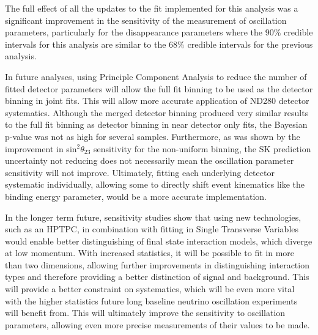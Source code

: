 The full effect of all the updates to the fit implemented for this analysis was a significant improvement in the sensitivity of the measurement of oscillation parameters, particularly for the disappearance parameters where the $90\%$ credible intervals for this analysis are similar to the $68\%$ credible intervals for the previous analysis.

In future analyses, using Principle Component Analysis to reduce the number of fitted detector parameters will allow the full fit binning to be used as the detector binning in joint fits. This will allow more accurate application of ND280 detector systematics. Although the merged detector binning produced very similar results to the full fit binning as detector binning in near detector only fits, the Bayesian p-value was not as high for several samples. Furthermore, as was shown by the improvement in sin$^2\theta_{23}$ sensitivity for the non-uniform binning, the SK prediction uncertainty not reducing does not necessarily mean the oscillation parameter sensitivity will not improve. Ultimately, fitting each underlying detector systematic individually, allowing some to directly shift event kinematics like the binding energy parameter, would be a more accurate implementation.

In the longer term future, sensitivity studies show that using new technologies, such as an HPTPC, in combination with fitting in Single Transverse Variables would enable better distinguishing of final state interaction models, which diverge at low momentum. With increased statistics, it will be possible to fit in more than two dimensions, allowing further improvements in distinguishing interaction types and therefore providing a better distinction of signal and background. This will provide a better constraint on systematics, which will be even more vital with the higher statistics future long baseline neutrino oscillation experiments will benefit from. This will ultimately improve the sensitivity to oscillation parameters, allowing even more precise measurements of their values to be made. 

\newpage
